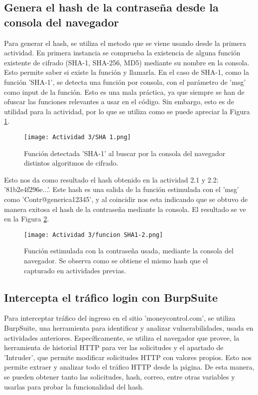 \documentclass[letter,12pt]{article}
\begin{document}
\subsection{Genera el hash de la contraseña desde la consola del navegador}
Para generar el hash, se utiliza el metodo que se viene usando desde la primera actividad. En primera instancia se comprueba la existencia de alguna función existente de cifrado (SHA-1, SHA-256, MD5) mediante su nombre en la consola. Esto permite saber si existe la función y llamarla. 
En el caso de SHA-1, como la función 'SHA-1', se detecta una función por consola, con el parámetro de 'msg' como input de la función. Esto es una mala práctica, ya que siempre se han de ofuscar las funciones relevantes a usar en el código. Sin embargo, esto es de utilidad para la actividad, por lo que se utiliza como se puede apreciar la Figura \ref{fig:SHA1-2}.

\begin{figure}[H]
    \centering
    \texttt{[image: Actividad 3/SHA 1.png]}
    \caption{Función detectada 'SHA-1' al buscar por la consola del navegador distintos algoritmos de cifrado.}
    \label{fig:SHA1-2}
\end{figure}

Esto nos da como resultado el hash obtenido en la actividad 2.1 y 2.2: '81b2e4f296e...'. Este hash es una salida de la función estimulada con el 'msg' como 'Contr@generica12345', y al coincidir nos esta indicando que se obtuvo de manera exitosa el hash de la contraseña mediante la consola. El resultado se ve en la Figura \ref{fig:SHA-1-2}.

\begin{figure}[H]
    \centering
    \texttt{[image: Actividad 3/funcion SHA1-2.png]}
    \caption{Función estimulada con la contraseña usada, mediante la consola del navegador. Se observa como se obtiene el mismo hash que el capturado en actividades previas.}
    \label{fig:SHA-1-2}
\end{figure}

\subsection{Intercepta el tráfico login con BurpSuite}
Para interceptar tráfico del ingreso en el sitio 'moneycontrol.com', se utiliza BurpSuite, una herramienta para identificar y analizar vulnerabilidades, usada en actividades anteriores. Específicamente, se utiliza el navegador que provee, la herramienta de historial HTTP para ver las solicitudes y el apartado de 'Intruder', que permite modificar solicitudes HTTP con valores propios. Esto nos permite extraer y analizar todo el tráfico HTTP desde la página. De esta manera, se pueden obtener tanto las solicitudes, hash, correo, entre otras variables y usarlas para probar la funcionalidad del hash.
\end{document}
